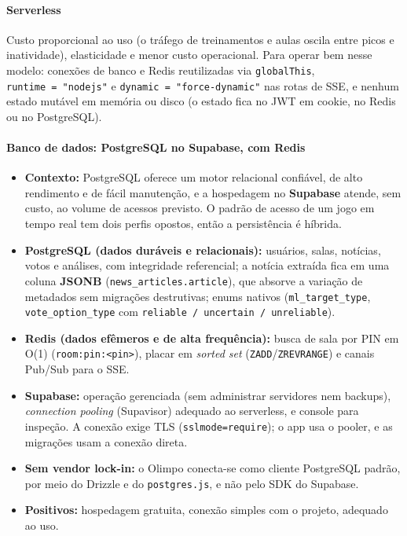 \documentclass[
  brazilian,
  11pt,
]{article}
\providecommand{\tightlist}{%
  \setlength{\itemsep}{0pt}\setlength{\parskip}{0pt}}
\begin{document}
\paragraph{Serverless}\label{serverless}

Custo proporcional ao uso (o tráfego de treinamentos e aulas oscila entre picos e inatividade), elasticidade e menor custo operacional. Para operar bem nesse modelo: conexões de banco e Redis reutilizadas via \texttt{globalThis}, \texttt{runtime\ =\ "nodejs"} e \texttt{dynamic\ =\ "force-dynamic"} nas rotas de SSE, e nenhum estado mutável em memória ou disco (o estado fica no JWT em cookie, no Redis ou no PostgreSQL).

\paragraph{Banco de dados: PostgreSQL no Supabase, com Redis}\label{banco-de-dados-postgresql-no-supabase-com-redis}

\begin{itemize}
\tightlist
\item
  \textbf{Contexto:} PostgreSQL oferece um motor relacional confiável, de alto rendimento e de fácil manutenção, e a hospedagem no \textbf{Supabase} atende, sem custo, ao volume de acessos previsto. O padrão de acesso de um jogo em tempo real tem dois perfis opostos, então a persistência é híbrida.
\item
  \textbf{PostgreSQL (dados duráveis e relacionais):} usuários, salas, notícias, votos e análises, com integridade referencial; a notícia extraída fica em uma coluna \textbf{JSONB} (\texttt{news\_articles.article}), que absorve a variação de metadados sem migrações destrutivas; enums nativos (\texttt{ml\_target\_type}, \texttt{vote\_option\_type} com \texttt{reliable\ /\ uncertain\ /\ unreliable}).
\item
  \textbf{Redis (dados efêmeros e de alta frequência):} busca de sala por PIN em O(1) (\texttt{room:pin:\textless{}pin\textgreater{}}), placar em \emph{sorted set} (\texttt{ZADD}/\texttt{ZREVRANGE}) e canais Pub/Sub para o SSE.
\item
  \textbf{Supabase:} operação gerenciada (sem administrar servidores nem backups), \emph{connection pooling} (Supavisor) adequado ao serverless, e console para inspeção. A conexão exige TLS (\texttt{sslmode=require}); o app usa o pooler, e as migrações usam a conexão direta.
\item
  \textbf{Sem vendor lock-in:} o Olimpo conecta-se como cliente PostgreSQL padrão, por meio do Drizzle e do \texttt{postgres.js}, e não pelo SDK do Supabase.
\item
  \textbf{Positivos:} hospedagem gratuita, conexão simples com o projeto, adequado ao uso.
\end{itemize}
\end{document}

